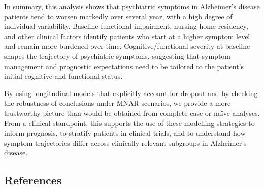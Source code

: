 \documentclass[
  9pt,
  letterpaper,
  DIV=11,
  numbers=noendperiod]{scrartcl}
\begin{document}
In summary, this analysis shows that psychiatric symptoms in Alzheimer's
disease patients tend to worsen markedly over several year, with a high
degree of individual variability. Baseline functional impairment,
nursing-home residency, and other clinical factors identify patients who
start at a higher symptom level and remain more burdened over time.
Cognitive/functional severity at baseline shapes the trajectory of
psychiatric symptoms, suggesting that symptom management and prognostic
expectations need to be tailored to the patient's initial cognitive and
functional status.

By using longitudinal models that explicitly account for dropout and by
checking the robustness of conclusions under MNAR scenarios, we provide
a more trustworthy picture than would be obtained from complete-case or
naïve analyses. From a clinical standpoint, this supports the use of
these modelling strategies to inform prognosis, to stratify patients in
clinical trials, and to understand how symptom trajectories differ
across clinically relevant subgroups in Alzheimer's disease.

\subsection{References}\label{references}
\end{document}
